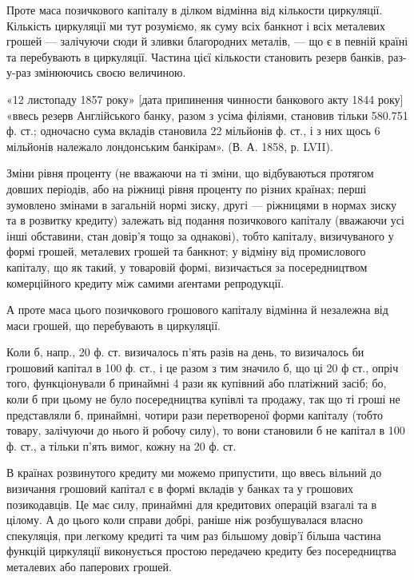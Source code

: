 Проте маса позичкового капіталу в ділком відмінна від кількости циркуляції.
Кількість циркуляції ми тут розуміємо, як суму всіх банкнот і всіх металевих
грошей — залічуючи сюди й зливки благородних металів, — що є в певній
країні та перебувають в циркуляції. Частина цієї кількости становить резерв
банків, раз-у-раз змінюючись своєю величиною.

«12 листопаду 1857 року» [дата припинення чинности банкового акту
1844 року] «ввесь резерв Англійського банку, разом з усіма філіями, становив
тільки 580.751 ф. ст.; одночасно сума вкладів становила 22 мільйонів ф. ст.,
і з них щось 6 мільйонів належало лондонським банкірам». (В. А. 1858, р. LVII).

Зміни рівня проценту (не вважаючи на ті зміни, що відбуваються протягом
довших періодів, або на ріжниці рівня проценту по різних країнах; перші
зумовлено змінами в загальній нормі зиску, другі — ріжницями в нормах зиску
та в розвитку кредиту) залежать від подання позичкового капіталу (вважаючи
усі інші обставини, стан довір’я тощо за однакові), тобто капіталу, визичуваного
у формі грошей, металевих грошей та банкнот; у відміну від промислового
капіталу, що як такий, у товаровій формі, визичається за посередництвом
комерційного кредиту між самими аґентами репродукції.

А проте маса цього позичкового грошового капіталу відмінна й незалежна
від маси грошей, що перебувають в циркуляції.

Коли б, напр., 20 ф. ст. визичалось п’ять разів на день, то визичалось би
грошовий капітал в 100 ф. ст., і це разом з тим значило б, що ці 20 ф ст.,
опріч того, функціонували б принаймні 4 рази як купівний або платіжний
засіб; бо, коли б при цьому не було посередництва купівлі та продажу, так
що ті гроші не представляли б, принаймні, чотири рази перетвореної форми
капіталу (тобто товару, залічуючи до нього й робочу силу), то вони становили б
не капітал в 100 ф. ст., а тільки п’ять вимог, кожну на 20 ф. ст.

В країнах розвинутого кредиту ми можемо припустити, що ввесь вільний до
визичання грошовий капітал є в формі вкладів у банках та у грошових позикодавців.
Це має силу, принаймні для кредитових операцій взагалі та в цілому. А до цього
коли справи добрі, раніше ніж розбушувалася власно спекуляція, при легкому кредиті
та чим раз більшому довір’ї більша частина функцій циркуляції виконується
простою передачею кредиту без посередництва металевих або паперових грошей.

